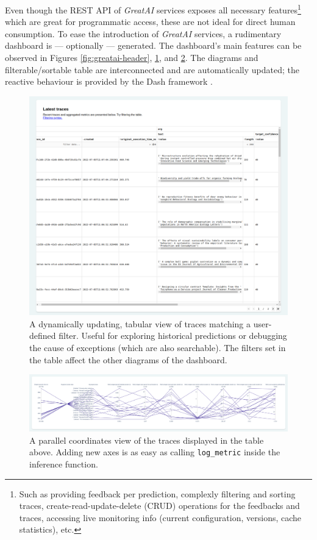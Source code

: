 Even though the REST API of \textit{GreatAI} services exposes all necessary features\footnote{Such as providing feedback per prediction, complexly filtering and sorting traces, create-read-update-delete (CRUD) operations for the feedbacks and traces, accessing live monitoring info (current configuration, versions, cache statistics), etc.} which are great for programmatic access, these are not ideal for direct human consumption. To ease the introduction of \textit{GreatAI} services, a rudimentary dashboard is --- optionally --- generated. The dashboard's main features can be observed in Figures \ref{fig:greatai-header}, \ref{fig:greatai-table}, and \ref{fig:greatai-parallel}. The diagrams and filterable/sortable table are interconnected and are automatically updated; the reactive behaviour is provided by the Dash framework \cite{shammamah_hossain-proc-scipy-2019}.

\begin{figure}
    \centering
    \includegraphics[width=\textwidth]{figures/greatai-table.png}
    \captionsetup{width=.9\linewidth}
    \caption{A dynamically updating, tabular view of traces matching a user-defined filter. Useful for exploring historical predictions or debugging the cause of exceptions (which are also searchable). The filters set in the table affect the other diagrams of the dashboard.}
    \label{fig:greatai-table}
\end{figure}

\begin{figure}
    \centering
    \includegraphics[width=\textwidth]{figures/greatai-parallel.png}
    \captionsetup{width=.9\linewidth}
    \caption{A parallel coordinates view of the traces displayed in the table above. Adding new axes is as easy as calling \texttt{log\_metric} inside the inference function.}
    \label{fig:greatai-parallel}
\end{figure}

